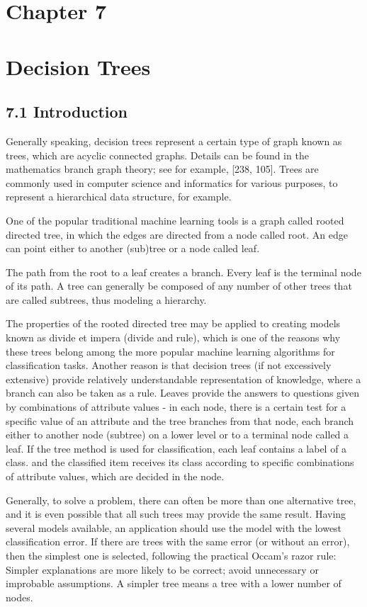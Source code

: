 \documentclass[10pt]{book}
\begin{document}
\section*{Chapter 7}
\section*{Decision Trees}
\subsection*{7.1 Introduction}
Generally speaking, decision trees represent a certain type of graph known as trees, which are acyclic connected graphs. Details can be found in the mathematics branch graph theory; see for example, [238, 105]. Trees are commonly used in computer science and informatics for various purposes, to represent a hierarchical data structure, for example.

One of the popular traditional machine learning tools is a graph called rooted directed tree, in which the edges are directed from a node called root. An edge can point either to another (sub)tree or a node called leaf.

The path from the root to a leaf creates a branch. Every leaf is the terminal node of its path. A tree can generally be composed of any number of other trees that are called subtrees, thus modeling a hierarchy.

The properties of the rooted directed tree may be applied to creating models known as divide et impera (divide and rule), which is one of the reasons why these trees belong among the more popular machine learning algorithms for classification tasks. Another reason is that decision trees (if not excessively extensive) provide relatively understandable representation of knowledge, where a branch can also be taken as a rule. Leaves provide the answers to questions given by combinations of attribute values - in each node, there is a certain test for a specific value of an attribute and the tree branches from that node, each branch either to another node (subtree) on a lower level or to a terminal node called a leaf. If the tree method is used for classification, each leaf contains a label of a class. and the classified item receives its class according to specific combinations of attribute values, which are decided in the node.

Generally, to solve a problem, there can often be more than one alternative tree, and it is even possible that all such trees may provide the same result. Having several models available, an application should use the model with the lowest classification error. If there are trees with the same error (or without an error), then the simplest one is selected, following the practical Occam's razor rule: Simpler explanations are more likely to be correct; avoid unnecessary or improbable assumptions. A simpler tree means a tree with a lower number of nodes.
\end{document}
